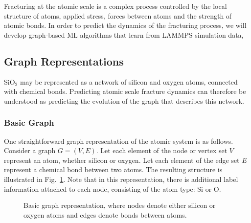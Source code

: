Fracturing at the atomic scale is a complex process controlled by the local structure of atoms, applied stress, forces between atoms and the strength of atomic bonds.  In order to predict the dynamics of the fracturing process, we will develop graph-based ML algorithms that learn from LAMMPS simulation data,


\subsection{Graph Representations}

SiO$_2$ may be represented as a network of silicon and oxygen atoms, connected with chemical bonds.  Predicting atomic scale fracture dynamics can therefore be understood as predicting the evolution of the graph that describes this network.

\subsubsection{Basic Graph}

One straightforward graph representation of the atomic system is as follows.  Consider a graph $G =(V,E)$.  Let each element of the node or vertex set $V$ represent an atom, whether silicon or oxygen.  Let each element of the edge set $E$ represent a chemical bond between two atoms.  The resulting structure is illustrated in Fig.~\ref{fig:basic_graph}.  Note that in this representation, there is additional label information attached to each node, consisting of the atom type: Si or O.

\begin{figure}
\centering
\noindent
\caption{Basic graph representation, where nodes denote either silicon or oxygen atoms and edges denote bonds between atoms.}
\label{fig:basic_graph}
\end{figure}

